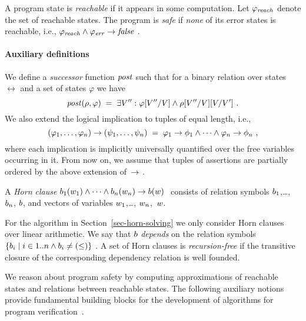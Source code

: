 A program state is \emph{reachable} if it appears in some computation.
Let $\varphi_\mathit{reach}$ denote the set of reachable states.
The program is \emph{safe} if \emph{none} of its error states is
reachable, i.e., $\varphi_\mathit{reach} \land \varphi_{\mathit{err}} \rightarrow \mathit{false}\ $.


\paragraph{Auxiliary definitions}

We define a \emph{successor} function $\mathit{post}$ such that for a
binary relation over states $\rel$ and a set of states $\varphi$ we
have
%
\begin{equation*}
  \mathit{post}(\rho, \varphi) \;=\; 
  \exists V'': \varphi[V''/V] \land \rho[V''/V][V/V']\ .
\end{equation*}
%
We also extend the logical implication to tuples of equal length, i.e.,
%
\begin{equation*}
  (\varphi_1, \dots, \varphi_n) \rightarrow (\psi_1, \dots, \psi_n) \;=\;
  \varphi_1 \rightarrow \phi_1 \land \dots \land
  \varphi_n \rightarrow \phi_n\ ,
\end{equation*}
%
where each implication is implicitly universally quantified over the
free variables occurring in it.
From now on, we assume that tuples of assertions are partially ordered
by the above extension of~$\rightarrow\ $.

A \emph{Horn clause} 
%
$%
  \HornBody_1(\FreeVars_1)\land \dots\land \HornBody_n(\FreeVars_n)
  \rightarrow \HornBody(\FreeVars)\ 
$%
% 
consists of relation symbols $b_1$,\dots, $b_n$,
$b$, and vectors of variables $w_1$,\dots,
$w_n$,~$w$.
\iffalse
The left-hand side of the implication is called the \emph{body} of the
clause and right-hand side is called the \emph{head}.
\fi 
For the algorithm \algSolveLinearHornClauses in
Section~\ref{sec-horn-solving} we only consider Horn clauses over linear
arithmetic.
We say that $b$ \emph{depends} on the relation symbols
$\{b_i \mid i\in1..n\land b_i \neq
(\leq)\}\ $.
A set of Horn clauses is \emph{recursion-free} if the transitive
closure of the corresponding dependency relation is well founded.


\iffalse
We reason about program safety by computing approximations of
reachable states and relations between reachable states. 
The following auxiliary notions provide fundamental building blocks
for the development of algorithms for program
verification~\cite{Floyd,lattice77,CousotAPCT84}.


